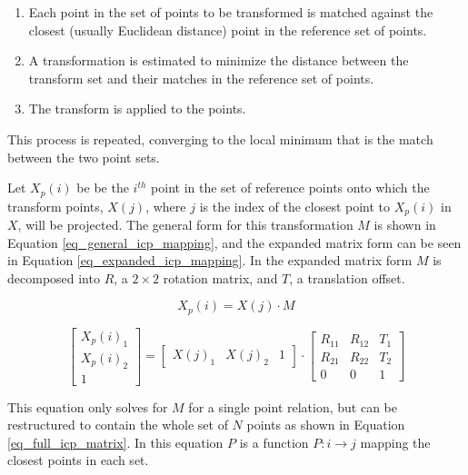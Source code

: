 \documentclass[sigconf]{acmart/acmart}
\begin{document}
\begin{enumerate}
	\item Each point in the set of points to be transformed is matched against the closest (usually Euclidean distance) point in the reference set of points.
	\item A transformation is estimated to minimize the distance between the transform set and their matches in the reference set of points.
	\item The transform is applied to the points.
\end{enumerate}

This process is repeated, converging to the local minimum that is the match between the two point sets.

Let $X_p(i)$ be be the $i^{th}$ point in the set of reference points onto which the transform points, $X(j)$, where $j$ is the index of the closest point to $X_p(i)$ in $X$, will be projected. The general form for this transformation $M$ is shown in Equation \ref{eq_general_icp_mapping}, and the expanded matrix form can be seen in Equation \ref{eq_expanded_icp_mapping}. In the expanded matrix form $M$ is decomposed into $R$, a $2 \times 2$ rotation matrix, and $T$, a translation offset.

\begin{equation}
X_p(i) = X(j) \cdot M
\label{eq_general_icp_mapping}
\end{equation}

\begin{equation}
\begin{bmatrix}
X_p(i)_1 \\
X_p(i)_2 \\
1 
\end{bmatrix}
=
\begin{bmatrix}
X(j)_1 & X(j)_2 & 1
\end{bmatrix}
\cdot
\begin{bmatrix}
R_{11} & R_{12} & T_1 \\
R_{21} & R_{22} & T_2 \\
0 & 0 & 1
\end{bmatrix}
\label{eq_expanded_icp_mapping}
\end{equation}

This equation only solves for $M$ for a single point relation, but can be restructured to contain
the whole set of $N$ points as shown in Equation \ref{eq_full_icp_matrix}. In this equation $P$ is a function $P: i \rightarrow j$ mapping the closest points in each set.
\end{document}

